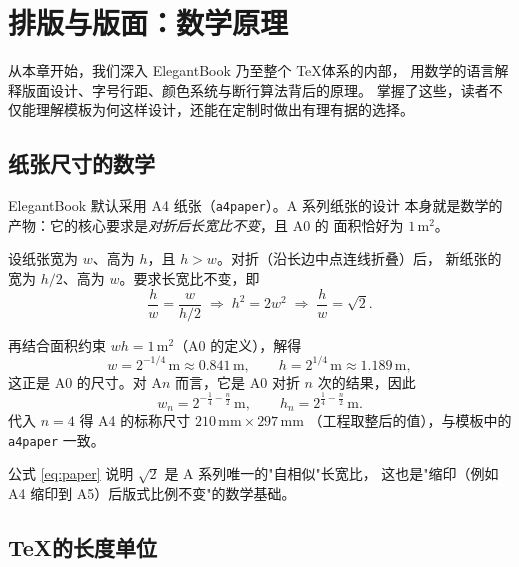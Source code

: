 
\chapter{排版与版面：数学原理}

从本章开始，我们深入 ElegantBook 乃至整个 \TeX 体系的内部，
用数学的语言解释版面设计、字号行距、颜色系统与断行算法背后的原理。
掌握了这些，读者不仅能理解模板为何这样设计，还能在定制时做出有理有据的选择。

\section{纸张尺寸的数学}

ElegantBook 默认采用 A4 纸张（\texttt{a4paper}）。A 系列纸张的设计
本身就是数学的产物：它的核心要求是\emph{对折后长宽比不变}，且 A0 的
面积恰好为 $1\,\mathrm{m}^2$。

设纸张宽为 $w$、高为 $h$，且 $h>w$。对折（沿长边中点连线折叠）后，
新纸张的宽为 $h/2$、高为 $w$。要求长宽比不变，即
\begin{equation}
  \frac{h}{w} = \frac{w}{h/2}
  \;\Longrightarrow\;
  h^2 = 2w^2
  \;\Longrightarrow\;
  \frac{h}{w} = \sqrt{2}.
  \label{eq:paper}
\end{equation}

再结合面积约束 $wh = 1\,\mathrm{m}^2$（A0 的定义），解得
\begin{equation}
  w = 2^{-1/4}\,\mathrm{m} \approx 0.841\,\mathrm{m},\qquad
  h = 2^{1/4}\,\mathrm{m} \approx 1.189\,\mathrm{m},
\end{equation}
这正是 A0 的尺寸。对 A$n$ 而言，它是 A0 对折 $n$ 次的结果，因此
\begin{equation}
  w_n = 2^{-\frac{1}{4}-\frac{n}{2}}\,\mathrm{m},\qquad
  h_n = 2^{\frac{1}{4}-\frac{n}{2}}\,\mathrm{m}.
  \label{eq:aseries}
\end{equation}
代入 $n=4$ 得 A4 的标称尺寸 $210\,\mathrm{mm}\times 297\,\mathrm{mm}$
（工程取整后的值），与模板中的 \texttt{a4paper} 一致。

\begin{remark}
公式 \eqref{eq:paper} 说明 $\sqrt{2}$ 是 A 系列唯一的"自相似"长宽比，
这也是"缩印（例如 A4 缩印到 A5）后版式比例不变"的数学基础。
\end{remark}

\section{\TeX 的长度单位}

